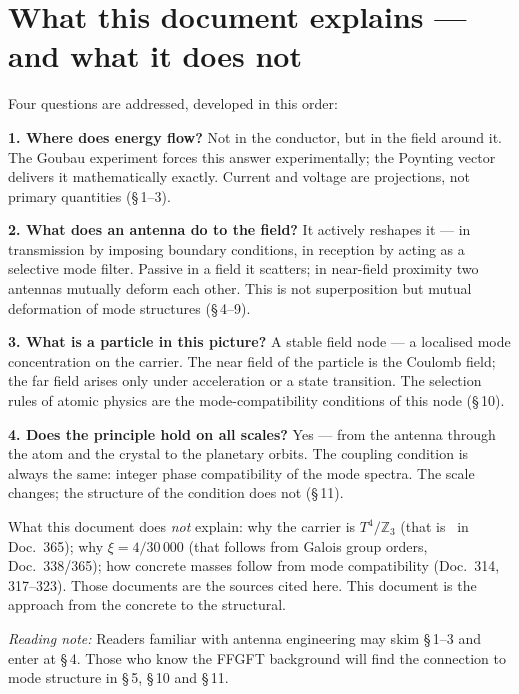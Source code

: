 \section*{What this document explains --- and what it does not}

Four questions are addressed, developed in this order:

\textbf{1. Where does energy flow?} Not in the conductor, but in the field
around it. The Goubau experiment forces this answer experimentally; the
Poynting vector delivers it mathematically exactly. Current and voltage
are projections, not primary quantities (\S\,1--3).

\textbf{2. What does an antenna do to the field?} It actively reshapes
it --- in transmission by imposing boundary conditions, in reception by
acting as a selective mode filter. Passive in a field it scatters; in
near-field proximity two antennas mutually deform each other. This is
not superposition but mutual deformation of mode structures (\S\,4--9).

\textbf{3. What is a particle in this picture?} A stable field node ---
a localised mode concentration on the carrier. The near field of the
particle is the Coulomb field; the far field arises only under
acceleration or a state transition. The selection rules of atomic
physics are the mode-compatibility conditions of this node (\S\,10).

\textbf{4. Does the principle hold on all scales?} Yes --- from the
antenna through the atom and the crystal to the planetary orbits. The
coupling condition is always the same: integer phase compatibility of
the mode spectra. The scale changes; the structure of the condition
does not (\S\,11).

What this document does \emph{not} explain: why the carrier is
$T^4/\mathbb{Z}_3$ (that is \SetzM\ in Doc.~365); why $\xi = 4/30\,000$
(that follows from Galois group orders, Doc.~338/365); how concrete
masses follow from mode compatibility (Doc.~314, 317--323). Those
documents are the sources cited here. This document is the approach
from the concrete to the structural.

\vspace{0.5em}
\noindent
\textit{Reading note:} Readers familiar with antenna engineering may skim
\S\,1--3 and enter at \S\,4. Those who know the FFGFT background will find
the connection to mode structure in \S\,5, \S\,10 and \S\,11.

